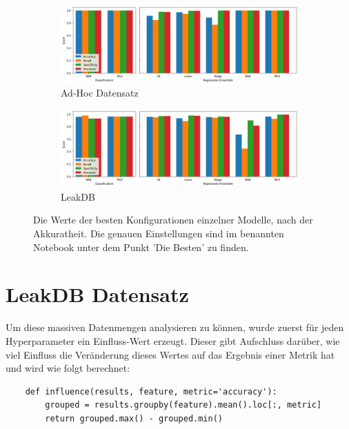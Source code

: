 \begin{figure}[h]
    \centering
    \begin{subfigure}{\textwidth}
        \includegraphics[width=1.0\textwidth]{res/res-best-adhoc}
        \caption{Ad-Hoc Datensatz\vspace{1em}}
        \label{fig:res-best-adhoc}
    \end{subfigure}
    \begin{subfigure}{\textwidth}
        \includegraphics[width=1.0\textwidth]{res/res-best-leakdb}
        \caption{LeakDB}
        \label{fig:res-best-leakdb}
    \end{subfigure}
    \caption{Die Werte der besten Konfigurationen einzelner Modelle, nach der Akkuratheit. Die genauen
        Einstellungen sind im benannten Notebook unter dem Punkt 'Die Besten' zu finden.}
\end{figure}

\section{LeakDB Datensatz}

Um diese massiven Datenmengen analysieren zu können, wurde zuerst für jeden Hyperparameter ein Einfluss-Wert
 erzeugt. Dieser gibt Aufschluss darüber, wie viel Einfluss die Veränderung dieses Wertes auf das Ergebnis
 einer Metrik hat und wird wie folgt berechnet:

\begin{verbatim}
    def influence(results, feature, metric='accuracy'):
        grouped = results.groupby(feature).mean().loc[:, metric]
        return grouped.max() - grouped.min()
\end{verbatim}

